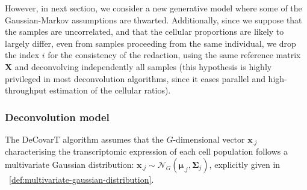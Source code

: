 \documentclass[long, final]{jobim}
\begin{document}
However, in next section, we consider a new generative model where some of the Gaussian-Markov assumptions are thwarted. Additionally, since we suppose that the samples are uncorrelated, and that the cellular proportions are likely to largely differ, even from samples proceeding from the same individual, we drop the index $i$ for the consistency of the redaction, using the same reference matrix $\boldsymbol{X}$ and deconvolving independently all samples (this hypothesis is highly privileged in most deconvolution algorithms, since it eases parallel and high-throughput estimation of the cellular ratios). 


\subsubsection{Deconvolution model}
\label{subsubsec:deconvolution-model}

The DeCovarT algorithm assumes that the $G$-dimensional vector $\boldsymbol{x}_{.j}$ characterising the transcriptomic expression of each cell population follows a multivariate Gaussian distribution: $\boldsymbol{x}_{.j} \sim \mathcal{N}_G(\boldsymbol{\mu}_{.j}, \boldsymbol{\boldsymbol{\Sigma}}_{j})$, explicitly given in ~\ref{def:multivariate-gaussian-distribution}.
\end{document}
